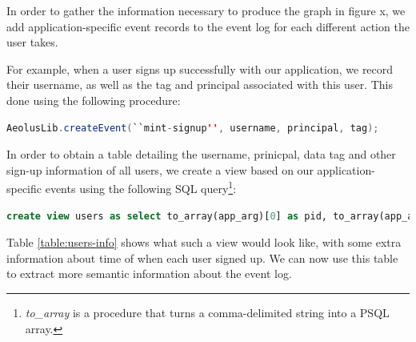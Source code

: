 In order to gather the information necessary to produce the graph in figure x, we add application-specific event records to the event log for each different action the user takes.

For example, when a user signs up successfully with our application, we record their username, as well as the tag and principal associated with this user. This done using the following procedure:

\begin{lstlisting}[language=Java]
  AeolusLib.createEvent(``mint-signup'', username, principal, tag);
\end{lstlisting}

In order to obtain a table detailing the username, prinicpal, data tag and other sign-up information of all users, we create a view based on our application-specific events using the following SQL query\footnote{\emph{to\_array} is a procedure that turns a comma-delimited string into a PSQL array.}:

\begin{lstlisting}[language=SQL, deletendkeywords={TIMESTAMP}]
create view users as select to_array(app_arg)[0] as pid, to_array(app_arg)[1] as username, to_array(app_arg)[2] as tag, timestamp as signed_up, event_counter from events where op_name='mint-signup'
\end{lstlisting}

Table \ref{table:users-info} shows what such a view would look like, with some extra information about time of when each user signed up. We can now use this table to extract more semantic information about the event log.

